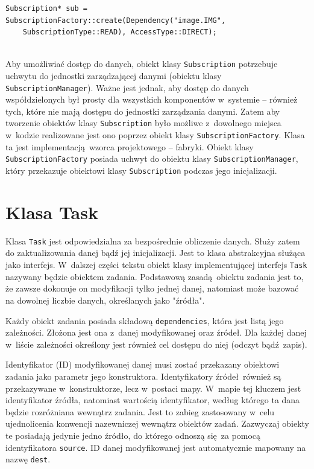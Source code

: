\begin{minipage}{\textwidth}
	\begin{lstlisting}[label=subscription:direct, caption={Przykład tworzenia obiektu klasy \lstinline$Subscription$ z~bezpośrednim dostępem do danych.},alsoletter={()[].=}]
Subscription* sub = SubscriptionFactory::create(Dependency("image.IMG",
	SubscriptionType::READ), AccessType::DIRECT);
	
	\end{lstlisting}
\end{minipage}

Aby umożliwiać dostęp do danych, obiekt klasy \lstinline$Subscription$ potrzebuje uchwytu do jednostki zarządzającej danymi (obiektu klasy \lstinline$SubscriptionManager$). Ważne jest jednak, aby dostęp do danych współdzielonych był prosty dla wszystkich komponentów w~systemie -- również tych, które nie mają dostępu do jednostki zarządzania danymi. Zatem aby tworzenie obiektów klasy \lstinline$Subscription$ było możliwe z~dowolnego miejsca w~kodzie realizowane jest ono poprzez obiekt klasy \lstinline$SubscriptionFactory$. Klasa ta jest implementacją wzorca projektowego -- fabryki. Obiekt klasy \lstinline$SubscriptionFactory$ posiada uchwyt do obiektu klasy \lstinline$SubscriptionManager$, który przekazuje obiektowi klasy \lstinline$Subscription$ podczas jego inicjalizacji. 

\section{Klasa Task}
Klasa \lstinline$Task$ jest odpowiedzialna za bezpośrednie obliczenie danych. Służy zatem do zaktualizowania danej bądź jej inicjalizacji. Jest to klasa abstrakcyjna służąca jako interfejs. W~dalszej części tekstu obiekt klasy implementującej interfejs \lstinline$Task$ nazywany będzie obiektem zadania. Podstawową zasadą obiektu zadania jest to, że zawsze dokonuje on modyfikacji tylko jednej danej, natomiast może bazować na dowolnej liczbie danych, określanych jako "źródła". 

Każdy obiekt zadania posiada składową \lstinline$dependencies$, która jest listą jego zależności. Złożona jest ona z~danej modyfikowanej oraz źródeł. Dla każdej danej w~liście zależności określony jest również cel dostępu do niej (odczyt bądź zapis).

Identyfikator (ID) modyfikowanej danej musi zostać przekazany obiektowi zadania jako parametr jego konstruktora. Identyfikatory źródeł również są przekazywane w~konstruktorze, lecz w~postaci mapy. W~mapie tej kluczem jest identyfikator źródła, natomiast wartością identyfikator, według którego ta dana będzie rozróżniana wewnątrz zadania. Jest to zabieg zastosowany w~celu ujednolicenia konwencji nazewniczej wewnątrz obiektów zadań. Zazwyczaj obiekty te posiadają jedynie jedno źródło, do którego odnoszą się za pomocą identyfikatora \lstinline$source$. ID danej modyfikowanej jest automatycznie mapowany na nazwę \lstinline$dest$. 

